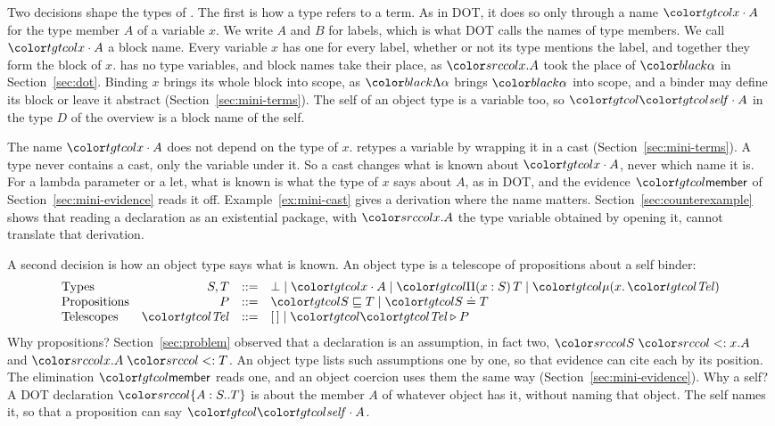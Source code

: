 Two decisions shape the types of \FCdot. The first is how a type refers to a term. As in DOT, it does so only through a name $\sel{x}{A}$ for the type member $A$ of a variable $x$. We write $A$ and $B$ for labels, which is what DOT calls the names of type members. We call $\sel{x}{A}$ a block name. Every variable $x$ has one for every label, whether or not its type mentions the label, and together they form the block of $x$. \FCdot has no type variables, and block names take their place, as $\src{x.A}$ took the place of $\run{\alpha}$ in Section~\ref{sec:dot}. Binding $x$ brings its whole block into scope, as $\run{\Lambda\alpha}$ brings $\run{\alpha}$ into scope, and a binder may define its block or leave it abstract (Section~\ref{sec:mini-terms}). The self of an object type is a variable too, so $\sel{\self}{A}$ in the type $D$ of the overview is a block name of the self.

The name $\sel{x}{A}$ does not depend on the type of $x$. \FCdot retypes a variable by wrapping it in a cast (Section~\ref{sec:mini-terms}). A type never contains a cast, only the variable under it. So a cast changes what is known about $\sel{x}{A}$, never which name it is. For a lambda parameter or a let, what is known is what the type of $x$ says about $A$, as in DOT, and the evidence $\ev{member}$ of Section~\ref{sec:mini-evidence} reads it off. Example~\ref{ex:mini-cast} gives a derivation where the name matters. Section~\ref{sec:counterexample} shows that reading a declaration as an existential package, with $\src{x.A}$ the type variable obtained by opening it, cannot translate that derivation.

A second decision is how an object type says what is known. An object type is a telescope of propositions about a self binder:
\[
\begin{array}{@{}lrcl@{}}
\text{Types} & S,T & ::= & \bot \mid \sel{x}{A} \mid \pit[x]{S}{T} \mid \obj[x]{\tel} \\
\text{Propositions} & P & ::= & \ple{S}{T} \mid \peq{S}{T} \\
\text{Telescopes} & \tel & ::= & \tnil \mid \tcons{\tel}{P}
\end{array}
\]
Why propositions? Section~\ref{sec:problem} observed that a declaration is an assumption, in fact two, $\src{S \sub x.A}$ and $\src{x.A \sub T}$. An object type lists such assumptions one by one, so that evidence can cite each by its position. The elimination $\ev{member}$ reads one, and an object coercion uses them the same way (Section~\ref{sec:mini-evidence}). Why a self? A DOT declaration $\dtyp{A}{S}{T}$ is about the member $A$ of whatever object has it, without naming that object. The self names it, so that a proposition can say $\sel{\self}{A}$.

